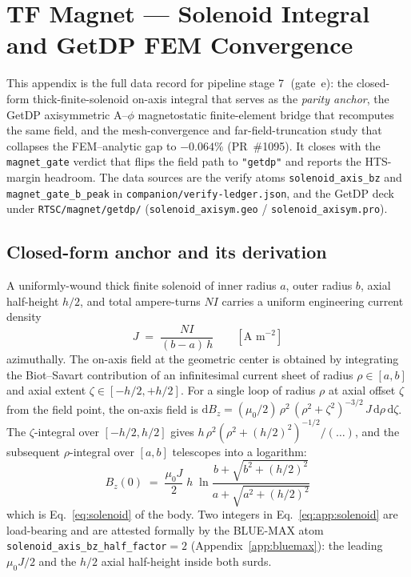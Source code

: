 \section{TF Magnet --- Solenoid Integral and GetDP FEM Convergence}
\label{app:magnet}

This appendix is the full data record for pipeline stage
\textcircled{\scriptsize 7} (gate~e): the closed-form thick-finite-solenoid
on-axis integral that serves as the \emph{parity anchor}, the GetDP
axisymmetric A--$\phi$ magnetostatic finite-element bridge that recomputes
the same field, and the mesh-convergence and far-field-truncation study that
collapses the FEM--analytic gap to $-0.064\%$ (PR~\#1095). It closes with the
\texttt{magnet\_gate} verdict that flips the field path to \texttt{"getdp"}
and reports the HTS-margin headroom. The data sources are the verify atoms
\texttt{solenoid\_axis\_bz} and \texttt{magnet\_gate\_b\_peak} in
\texttt{companion/verify-ledger.json}, and the GetDP deck under
\texttt{RTSC/magnet/getdp/} (\texttt{solenoid\_axisym.geo} /
\texttt{solenoid\_axisym.pro}).

\subsection{Closed-form anchor and its derivation}
\label{app:magnet:anchor}

A uniformly-wound thick finite solenoid of inner radius $a$, outer radius $b$,
axial half-height $h/2$, and total ampere-turns $NI$ carries a uniform
engineering current density
\begin{equation}
J \;=\; \frac{NI}{(b-a)\,h}\qquad[\text{A m}^{-2}]
\label{eq:app:J}
\end{equation}
azimuthally. The on-axis field at the geometric center is obtained by
integrating the Biot--Savart contribution of an infinitesimal current sheet
of radius $\rho\in[a,b]$ and axial extent $\zeta\in[-h/2,+h/2]$. For a single
loop of radius $\rho$ at axial offset $\zeta$ from the field point, the
on-axis field is $\mathrm{d}B_z = (\mu_0/2)\,\rho^{2}\,(\rho^{2}+\zeta^{2})^{-3/2}\,
J\,\mathrm{d}\rho\,\mathrm{d}\zeta$. The $\zeta$-integral over $[-h/2,h/2]$
gives $h\,\rho^{2}(\rho^{2}+(h/2)^{2})^{-1/2}/(\dots)$, and the subsequent
$\rho$-integral over $[a,b]$ telescopes into a logarithm:
\begin{equation}
\boxed{\;
B_z(0) \;=\; \frac{\mu_0 J}{2}\;h\;
  \ln\!\frac{b + \sqrt{b^{2} + (h/2)^{2}}}{a + \sqrt{a^{2} + (h/2)^{2}}}\;}
\label{eq:app:solenoid}
\end{equation}
which is Eq.~\eqref{eq:solenoid} of the body. Two integers in
Eq.~\eqref{eq:app:solenoid} are load-bearing and are attested formally by the
BLUE-MAX atom \texttt{solenoid\_axis\_bz\_half\_factor}$=2$
(Appendix~\ref{app:bluemax}): the leading $\mu_0 J/2$ and the $h/2$ axial
half-height inside both surds.

